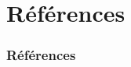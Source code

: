 \section*{Références}

\begin{frame}[allowframebreaks]
    \frametitle{Références}

    \nocite{*}        %

\end{frame}
\note{
}
